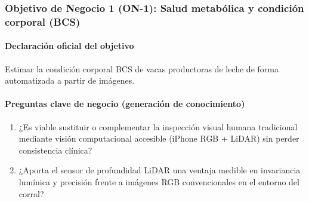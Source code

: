 \subsubsection{Objetivo de Negocio 1 (ON-1): Salud metabólica y condición corporal (BCS)}

\paragraph{Declaración oficial del objetivo}
Estimar la condición corporal BCS de vacas productoras de leche de forma automatizada a partir de imágenes.

\paragraph{Preguntas clave de negocio (generación de conocimiento)}

\begin{enumerate}
  \item ¿Es viable sustituir o complementar la inspección visual humana tradicional mediante visión computacional accesible (iPhone RGB + LiDAR) sin perder consistencia clínica?
  \item ¿Aporta el sensor de profundidad LiDAR una ventaja medible en invariancia lumínica y precisión frente a imágenes RGB convencionales en el entorno del corral?
\end{enumerate}
